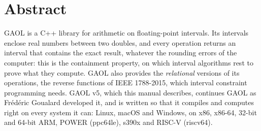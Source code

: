\chapter*{Abstract}
\thispagestyle{plain}

GAOL is a C++ library for arithmetic on floating-point intervals. Its
intervals enclose real numbers between two doubles, and every operation
returns an interval that contains the exact result, whatever the rounding
errors of the computer: this is the containment property, on which interval
algorithms rest to prove what they compute. GAOL also provides the
\emph{relational} versions of its operations, the reverse functions of IEEE
1788-2015, which interval constraint programming needs. GAOL v5, which this
manual describes, continues GAOL as Fr\'ed\'eric Goualard developed it, and
is written so that it compiles and computes right on every system it can:
Linux, macOS and Windows, on x86, x86-64, 32-bit and 64-bit ARM, POWER
(ppc64le), s390x and RISC-V (riscv64).

